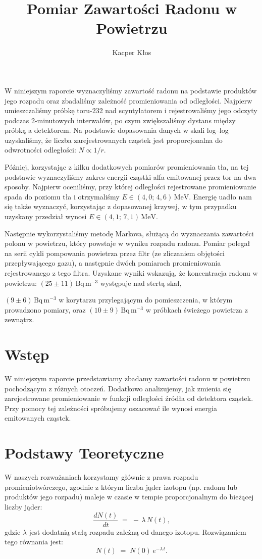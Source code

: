 \documentclass[12pt]{article}
\title{Pomiar Zawartości Radonu w Powietrzu}
\author{Kacper Kłos}
\begin{document}
\maketitle

W niniejszym raporcie wyznaczyliśmy zawartość radonu na podstawie produktów jego rozpadu oraz zbadaliśmy zależność promieniowania od odległości. Najpierw umieszczaliśmy próbkę toru-232 nad scyntylatorem i rejestrowaliśmy jego odczyty podczas 2-minutowych interwałów, po czym zwiększaliśmy dystans między próbką a detektorem. Na podstawie dopasowania danych w skali log–log uzyskaliśmy, że liczba zarejestrowanych cząstek jest proporcjonalna do odwrotności odległości: \(N \propto 1/r\).

Później, korzystając z kilku dodatkowych pomiarów promieniowania tła, na tej podstawie wyznaczyliśmy zakres energii cząstki alfa emitowanej przez tor na dwa sposoby. Najpierw oceniliśmy, przy której odległości rejestrowane promieniowanie spada do poziomu tła i otrzymaliśmy $E \in (4{,}0;\,4{,}6)\,\mathrm{MeV}$. Energię uadło nam się także wyznaczyć, korzystając z dopasowanej krzywej, w tym przypadku uzyskany przedział wynosi $E \in (4{,}1;\,7{,}1)\,\mathrm{MeV}$.

Następnie wykorzystaliśmy metodę Markova, służącą do wyznaczania zawartości polonu w powietrzu, który powstaje w wyniku rozpadu radonu. Pomiar polegał na serii cykli pompowania powietrza przez filtr (ze zliczaniem objętości przepływającego gazu), a następnie dwóch pomiarach promieniowania rejestrowanego z tego filtra. Uzyskane wyniki wskazują, że koncentracja radonu w powietrzu: \((25 \pm 11)\,\mathrm{Bq\,m^{-3}}\) występuje nad stertą skał,

\((9 \pm 6)\,\mathrm{Bq\,m^{-3}}\) w korytarzu przylegającym do pomieszczenia, w którym prowadzono pomiary, oraz \((10 \pm 9)\,\mathrm{Bq\,m^{-3}}\) w próbkach świeżego powietrza z zewnątrz.


\newpage

\section{Wstęp}
W niniejszym raporcie przedstawiamy zbadamy zawartości radonu w powietrzu pochodzącym z różnych otoczeń. Dodatkowo analizujemy, jak zmienia się zarejestrowane promieniowanie w funkcji odległości źródła od detektora cząstek. Przy pomocy tej zależności spróbujemy oszacować ile wynosi energia emitowanych cząstek.

\section{Podstawy Teoretyczne}
W naszych rozważaniach korzystamy głównie z prawa rozpadu promieniotwórczego, zgodnie z którym liczba jąder izotopu (np. radonu lub produktów jego rozpadu) maleje w czasie w tempie proporcjonalnym do bieżącej liczby jąder:
\[
	\frac{dN(t)}{dt} \;=\; -\,\lambda\,N(t),
\]
gdzie \(\lambda\) jest dodatnią stałą rozpadu zależną od danego izotopu. Rozwiązaniem tego równania jest:
\begin{equation}
	N(t) \;=\; N(0)\,e^{-\lambda\,t}.
	\label{eq:decay}
\end{equation}
\end{document}
